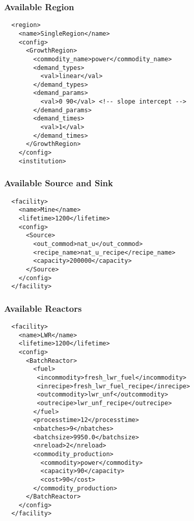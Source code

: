 \begin{frame}[fragile]
  \frametitle{Available Region}
\footnotesize{
  \begin{lstlisting}
  <region>
    <name>SingleRegion</name>
    <config>
      <GrowthRegion>
        <commodity_name>power</commodity_name>
        <demand_types>
          <val>linear</val>
        </demand_types>
        <demand_params>
          <val>0 90</val> <!-- slope intercept -->
        </demand_params>
        <demand_times>
          <val>1</val>
        </demand_times>
      </GrowthRegion>
    </config>
    <institution>
\end{lstlisting}
}
\end{frame}
\begin{frame}[fragile]
  \frametitle{Available Source and Sink}
  \begin{lstlisting}
  <facility>
    <name>Mine</name>
    <lifetime>1200</lifetime>
    <config>
      <Source>
        <out_commod>nat_u</out_commod>
        <recipe_name>nat_u_recipe</recipe_name>
        <capacity>200000</capacity>
      </Source>
    </config>
  </facility>
\end{lstlisting}
\end{frame} 
\begin{frame}[fragile]
  \frametitle{Available Reactors}
  \lstset{basicstyle=\tiny\ttfamily}
\begin{lstlisting}
  <facility>
    <name>LWR</name>
    <lifetime>1200</lifetime>
    <config>
      <BatchReactor>
        <fuel>
         <incommodity>fresh_lwr_fuel</incommodity>
         <inrecipe>fresh_lwr_fuel_recipe</inrecipe>
         <outcommodity>lwr_unf</outcommodity>
         <outrecipe>lwr_unf_recipe</outrecipe>
        </fuel>
        <processtime>12</processtime>
        <nbatches>9</nbatches> 
        <batchsize>9950.0</batchsize> 
        <nreload>2</nreload> 
        <commodity_production>
          <commodity>power</commodity>
          <capacity>90</capacity>
          <cost>90</cost>
        </commodity_production>
      </BatchReactor>
    </config>
  </facility>
\end{lstlisting}
\end{frame}


